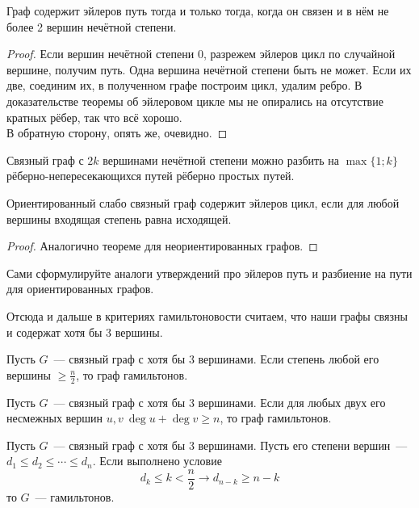 \documentclass{article}
\begin{document}
    \begin{claim}
        Граф содержит эйлеров путь тогда и только тогда, когда он связен и в нём не более 2 вершин нечётной степени.
    \end{claim}
    \begin{proof}
        Если вершин нечётной степени 0, разрежем эйлеров цикл по случайной вершине, получим путь. Одна вершина нечётной степени быть не может. Если их две, соединим их, в полученном графе построим цикл, удалим ребро. В доказательстве теоремы об эйлеровом цикле мы не опирались на отсутствие кратных рёбер, так что всё хорошо.\\
        В обратную сторону, опять же, очевидно.
    \end{proof}
    \begin{claim}
        Связный граф с $2k$ вершинами нечётной степени можно разбить на $\max\{1;k\}$ рёберно-непересекающихся путей рёберно простых путей.
    \end{claim}
    \begin{theorem}
        Ориентированный слабо связный граф содержит эйлеров цикл, если для любой вершины входящая степень равна исходящей.
    \end{theorem}
    \begin{proof}
        Аналогично теореме для неориентированных графов.
    \end{proof}
    \begin{remark}
        Сами сформулируйте аналоги утверждений про эйлеров путь и разбиение на пути для ориентированных графов.
    \end{remark}
    \begin{remark}
        Отсюда и дальше в критериях гамильтоновости считаем, что наши графы связны и содержат хотя бы 3 вершины.
    \end{remark}
    \begin{theorem}
        Пусть $G$~--- связный граф с хотя бы 3 вершинами. Если степень любой его вершины $\geqslant\frac n2$, то граф гамильтонов.
    \end{theorem}
    \begin{theorem}
        Пусть $G$~--- связный граф с хотя бы 3 вершинами. Если для любых двух его несмежных вершин $u,v~\deg u+\deg v\geqslant n$, то граф гамильтонов.
    \end{theorem}
    \begin{theorem}
        Пусть $G$~--- связный граф с хотя бы 3 вершинами. Пусть его степени вершин~--- $d_1\leqslant d_2\leqslant\cdots\leqslant d_n$. Если выполнено условие
        $$
        d_k\leqslant k<\frac n2\rightarrow d_{n-k}\geqslant n-k
        $$
        то $G$~--- гамильтонов.
    \end{theorem}
\end{document}
